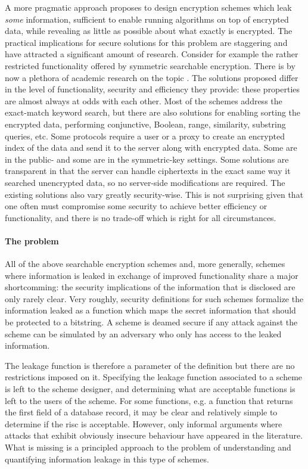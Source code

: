 A more pragmatic approach proposes to design encryption schemes which leak \emph{some} information, sufficient to enable running algorithms on top of encrypted data, while revealing as little as possible about what exactly is encrypted. 
The practical implications for secure solutions for this problem are staggering and have attracted a significant amount of research.
Consider for example  the rather restricted functionality offered by symmetric searchable encryption.
There is by now a plethora of academic research on the topic \cite{}. 
The solutions proposed differ in the level of functionality, security and efficiency they provide: 
these properties are almost always at odds with each other. 
Most of the schemes address the exact-match keyword search, but there are also solutions for enabling
sorting the encrypted data, performing conjunctive, Boolean, range, similarity, substring queries, etc. Some
protocols require a user or a proxy to create an encrypted index of the data and send it to the server along
with encrypted data. Some are in the public- and some are in the symmetric-key settings. Some solutions
are transparent in that the server can handle ciphertexts in the exact same way it searched unencrypted data,
so no server-side modifications are required. The existing solutions also vary greatly security-wise. This
is not surprising given that one often must compromise some security to achieve better efficiency or
functionality, and there is no trade-off which is right for all circumstances. 

\paragraph{The problem}
All of the above searchable encryption schemes and, more generally, schemes where information is leaked in exchange of improved functionality share a major shortcomming: the security implications of the information that is disclosed are only rarely clear. 
Very roughly, security definitions for such schemes formalize the information leaked as  a function which maps the secret information that should be protected to a bitstring.  A scheme is deamed secure if any attack against the scheme can be simulated by an adversary who only has access to the leaked information.

The leakage function is therefore a parameter of the definition but there are no restrictions imposed on it. 
Specifying the leakage function associated to a scheme is left to the scheme designer, and determining what are acceptable functions is left to the users of the scheme.
For some functions, e.g. a function that returns the first field of a database record, it may be clear and relatively simple to determine if the risc is acceptable.
However, only informal arguments where attacks that exhibit obviously insecure behaviour have appeared in the literature. 
What is missing is a principled approach to the problem of understanding and quantifying information leakage in this type of schemes. 

